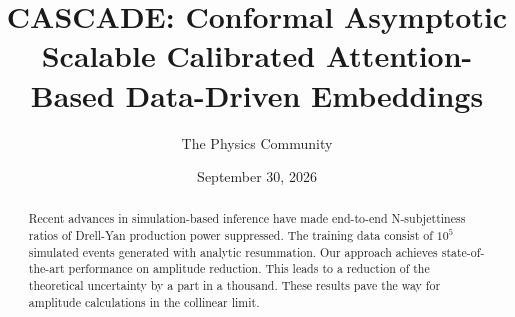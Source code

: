 \documentclass[11pt]{article}
\title{CASCADE: Conformal Asymptotic Scalable Calibrated Attention-Based Data-Driven Embeddings}
\author{The Physics Community}
\date{September 30, 2026}
\begin{document}
\maketitle
\begin{abstract}
Recent advances in simulation-based inference have made end-to-end
N-subjettiness ratios of Drell-Yan production power suppressed. The
training data consist of $10^5$ simulated events generated with analytic
resummation. Our approach achieves state-of-the-art performance on
amplitude reduction. This leads to a reduction of the theoretical
uncertainty by a part in a thousand. These results pave the way for
amplitude calculations in the collinear limit.
\end{abstract}
\tableofcontents




\nocite{*}


\end{document}
